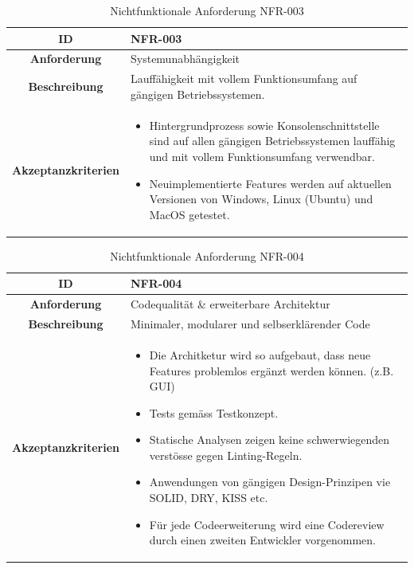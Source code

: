 \documentclass[a4paper,12pt]{report}
\begin{document}
    \begin{table}[h!]
        \centering
        \setlength{\leftmargini}{0.4cm}
        \begin{tabular}{|c|p{10cm}|}
            \hline
            \textbf{ID}           & NFR-003                                                                 \\ \hline
            \textbf{Anforderung}  & Systemunabhängigkeit                                                    \\ \hline
            \textbf{Beschreibung} & Lauffähigkeit mit vollem Funktionsumfang auf gängigen Betriebssystemen. \\ \hline
            \textbf{Akzeptanzkriterien} &
            \begin{itemize}
                \item Hintergrundprozess sowie Konsolenschnittstelle sind auf allen gängigen Betriebssystemen lauffähig und mit vollem Funktionsumfang verwendbar.
                \item Neuimplementierte Features werden auf aktuellen Versionen von Windows, Linux (Ubuntu) und MacOS getestet.
            \end{itemize}
            \\ \hline
        \end{tabular}
        \caption{Nichtfunktionale Anforderung NFR-003}\label{tab:table5}
    \end{table}

    \begin{table}[h!]
        \centering
        \setlength{\leftmargini}{0.4cm}
        \begin{tabular}{|c|p{10cm}|}
            \hline
            \textbf{ID}           & NFR-004                                        \\ \hline
            \textbf{Anforderung}  & Codequalität \& erweiterbare Architektur       \\ \hline
            \textbf{Beschreibung} & Minimaler, modularer und selbserklärender Code \\ \hline
            \textbf{Akzeptanzkriterien} &
            \begin{itemize}
                \item Die Architketur wird so aufgebaut, dass neue Features problemlos ergänzt werden können. (z.B. GUI)
                \item Tests gemäss Testkonzept.
                \item Statische Analysen zeigen keine schwerwiegenden verstösse gegen Linting-Regeln.
                \item Anwendungen von gängigen Design-Prinzipen vie SOLID, DRY, KISS etc.
                \item Für jede Codeerweiterung wird eine Codereview durch einen zweiten Entwickler vorgenommen.
            \end{itemize}
            \\ \hline
        \end{tabular}
        \caption{Nichtfunktionale Anforderung NFR-004}\label{tab:table6}
    \end{table}
\end{document}
